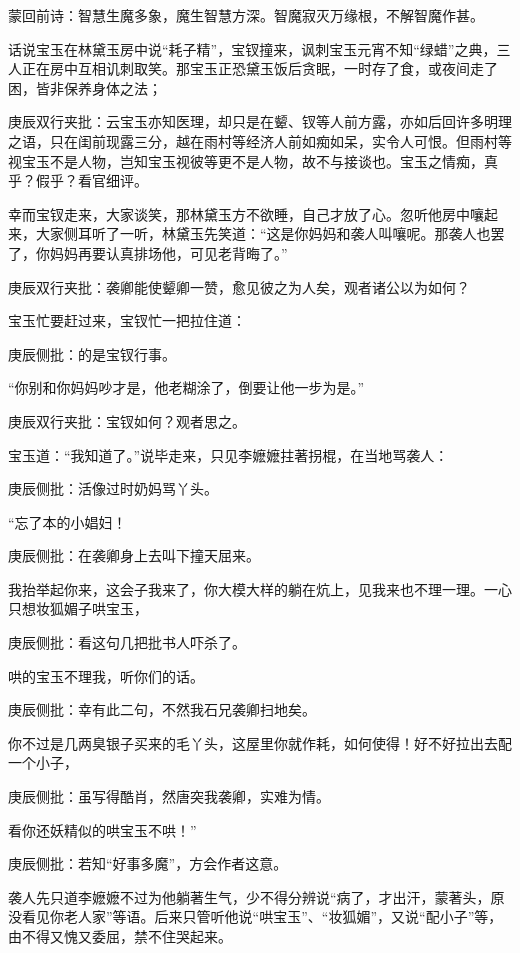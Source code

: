 
\begin{parag}

    \begin{note}蒙回前诗：智慧生魔多象，魔生智慧方深。智魔寂灭万缘根，不解智魔作甚。\end{note}
\end{parag}

\begin{parag}

    话说宝玉在林黛玉房中说“耗子精”，宝钗撞来，讽刺宝玉元宵不知“绿蜡”之典，三人正在房中互相讥刺取笑。那宝玉正恐黛玉饭后贪眠，一时存了食，或夜间走了困，皆非保养身体之法；\begin{note}庚辰双行夹批：云宝玉亦知医理，却只是在颦、钗等人前方露，亦如后回许多明理之语，只在闺前现露三分，越在雨村等经济人前如痴如呆，实令人可恨。但雨村等视宝玉不是人物，岂知宝玉视彼等更不是人物，故不与接谈也。宝玉之情痴，真乎？假乎？看官细评。\end{note}幸而宝钗走来，大家谈笑，那林黛玉方不欲睡，自己才放了心。忽听他房中嚷起来，大家侧耳听了一听，林黛玉先笑道：“这是你妈妈和袭人叫嚷呢。那袭人也罢了，你妈妈再要认真排场他，可见老背晦了。”\begin{note}庚辰双行夹批：袭卿能使颦卿一赞，愈见彼之为人矣，观者诸公以为如何？\end{note}
\end{parag}


\begin{parag}


    宝玉忙要赶过来，宝钗忙一把拉住道：\begin{note}庚辰侧批：的是宝钗行事。\end{note}“你别和你妈妈吵才是，他老糊涂了，倒要让他一步为是。”\begin{note}庚辰双行夹批：宝钗如何？观者思之。\end{note}宝玉道：“我知道了。”说毕走来，只见李嬷嬷拄著拐棍，在当地骂袭人：\begin{note}庚辰侧批：活像过时奶妈骂丫头。\end{note}“忘了本的小娼妇！\begin{note}庚辰侧批：在袭卿身上去叫下撞天屈来。\end{note}我抬举起你来，这会子我来了，你大模大样的躺在炕上，见我来也不理一理。一心只想妆狐媚子哄宝玉，\begin{note}庚辰侧批：看这句几把批书人吓杀了。\end{note}哄的宝玉不理我，听你们的话。\begin{note}庚辰侧批：幸有此二句，不然我石兄袭卿扫地矣。\end{note}你不过是几两臭银子买来的毛丫头，这屋里你就作耗，如何使得！好不好拉出去配一个小子，\begin{note}庚辰侧批：虽写得酷肖，然唐突我袭卿，实难为情。\end{note}看你还妖精似的哄宝玉不哄！”\begin{note}庚辰侧批：若知“好事多魔”，方会作者这意。\end{note}袭人先只道李嬷嬷不过为他躺著生气，少不得分辨说“病了，才出汗，蒙著头，原没看见你老人家”等语。后来只管听他说“哄宝玉”、“妆狐媚”，又说“配小子”等，由不得又愧又委屈，禁不住哭起来。
\end{parag}


